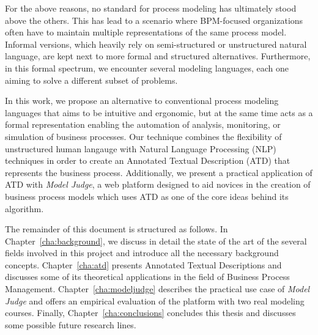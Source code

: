 For the above reasons, no standard for process modeling has ultimately stood above
the others. This has lead to a scenario where BPM-focused organizations often
have to maintain multiple representations of the same process model. Informal
versions, which heavily rely on semi-structured or unstructured natural
language, are kept next to more formal and structured alternatives. Furthermore,
in this formal spectrum, we encounter several modeling languages, each one
aiming to solve a different subset of problems\cite{10.1007/978-3-540-72035-5_7,
 van2003workflow}.

In this work, we propose an alternative to conventional process modeling
languages that aims to be intuitive and ergonomic, but at the same time acts 
as a formal representation enabling the automation of analysis, monitoring, or
simulation of business processes. Our technique combines the flexibility of
unstructured human langauge with Natural Language Processing (NLP) techniques in
order to create an Annotated Textual Description (ATD) that represents the
business process. Additionally, we present a practical application of ATD with
\emph{Model Judge}, a web platform designed to aid novices in the creation of
business process models which uses ATD as one of the core ideas behind its
algorithm.


The remainder of this document is structured as follows. In
Chapter~\ref{cha:background}, we discuss in detail the state of the art of the
several fields involved in this project and introduce all the necessary
background concepts. Chapter~\ref{cha:atd} presents Annotated Textual
Descriptions and discusses some of its theoretical applications in the field of
Business Process Management. Chapter~\ref{cha:modeljudge} describes the
practical use case of \emph{Model Judge} and offers an empirical evaluation of the
platform with two real modeling courses. Finally, Chapter~\ref{cha:conclusions}
concludes this thesis and discusses some possible future research lines.

